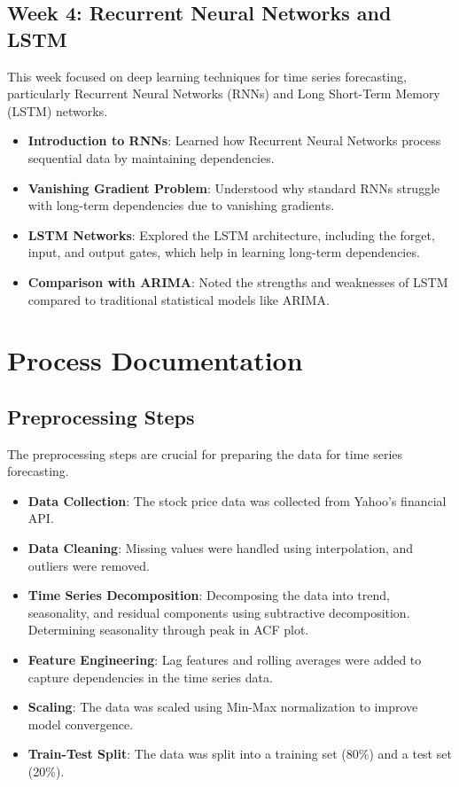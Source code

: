 \documentclass{article} %
\begin{document}
\subsection{Week 4: Recurrent Neural Networks and LSTM}

This week focused on deep learning techniques for time series forecasting, particularly Recurrent Neural Networks (RNNs) and Long Short-Term Memory (LSTM) networks.

\begin{itemize}
    \item \textbf{Introduction to RNNs}: Learned how Recurrent Neural Networks process sequential data by maintaining dependencies.
    \item \textbf{Vanishing Gradient Problem}: Understood why standard RNNs struggle with long-term dependencies due to vanishing gradients.
    \item \textbf{LSTM Networks}: Explored the LSTM architecture, including the forget, input, and output gates, which help in learning long-term dependencies.
    \item \textbf{Comparison with ARIMA}: Noted the strengths and weaknesses of LSTM compared to traditional statistical models like ARIMA.
\end{itemize}

\section{Process Documentation}

\subsection{Preprocessing Steps}
The preprocessing steps are crucial for preparing the data for time series forecasting.

\begin{itemize}
    \item \textbf{Data Collection}: The stock price data was collected from Yahoo's financial API.
    \item \textbf{Data Cleaning}: Missing values were handled using interpolation, and outliers were removed.
    \item \textbf{Time Series Decomposition}: Decomposing the data into trend, seasonality, and residual components using subtractive decomposition. Determining seasonality through peak in ACF plot.
    \item \textbf{Feature Engineering}: Lag features and rolling averages were added to capture dependencies in the time series data.
    \item \textbf{Scaling}: The data was scaled using Min-Max normalization to improve model convergence.
    \item \textbf{Train-Test Split}: The data was split into a training set (80\%) and a test set (20\%).
\end{itemize}
\end{document}
